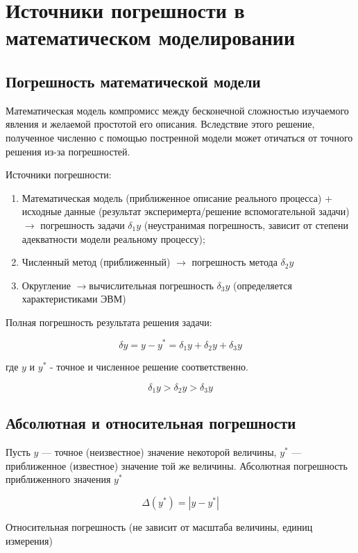 \section{Источники погрешности в математическом моделировании}
\label{sec:error-sources-in-modeling}

\subsection{Погрешность математической модели}

Математическая модель компромисс между бесконечной сложностью изучаемого явления и желаемой простотой его описания. Вследствие этого решение, полученное численно с помощью постренной модели может отичаться от точного решения из-за погрешностей.

Источники погрешности:
\begin{enumerate}
	\item Математическая модель (приближенное описание реального
	процесса) + исходные данные (результат
	эксперимерта/решение вспомогательной задачи) $\rightarrow$
	погрешность задачи $\delta_1y$ (неустранимая погрешность, зависит
	от степени адекватности модели реальному процессу);
	\item Численный метод (приближенный) $\rightarrow$ погрешность метода $\delta_2y$
	\item Округление $\rightarrow$вычислительная погрешность $\delta_3y$
	(определяется характеристиками ЭВМ)
\end{enumerate}

Полная погрешность результата решения задачи:

$$ \delta y = y - y^* = \delta_1 y + \delta_2 y + \delta_3 y $$

где \( y \) и \( y^* \) - точное и численное решение соответственно.

$$ \delta_1 y > \delta_2 y > \delta_3 y $$

\subsection{Абсолютная и относительная погрешности}

Пусть \( y \) — точное (неизвестное) значение некоторой величины, \( y^* \) — приближенное (известное) значение той же величины.  
Абсолютная погрешность приближенного значения \( y^* \)

$$ \Delta(y^*) = |y - y^*| $$

Относительная погрешность (не зависит от масштаба величины, единиц измерения)

